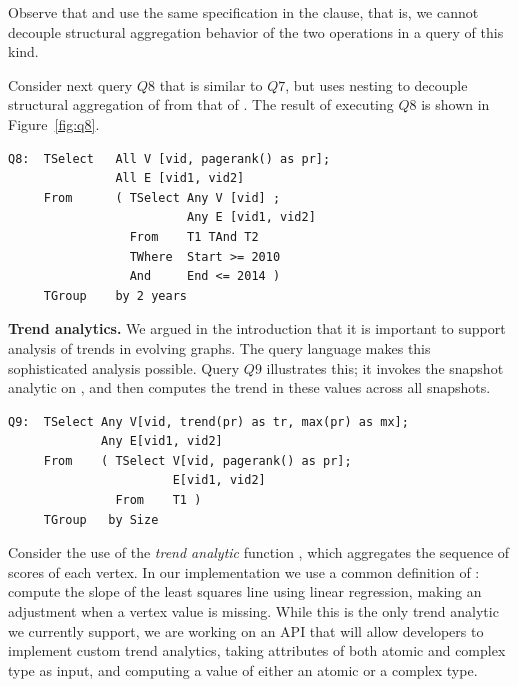 Observe that  and  use the same
specification in the  clause, that is, we cannot
decouple structural aggregation behavior of the two operations in a
query of this kind.

Consider next query $Q8$ that is similar to $Q7$, but uses nesting to
decouple structural aggregation of  from that of
. The result of executing $Q8$ is shown in
Figure~\ref{fig:q8}.

\begin{small}
\begin{verbatim}
Q8:  TSelect   All V [vid, pagerank() as pr];
               All E [vid1, vid2]
     From      ( TSelect Any V [vid] ; 
                         Any E [vid1, vid2]
                 From    T1 TAnd T2
                 TWhere  Start >= 2010 
                 And     End <= 2014 )
     TGroup    by 2 years
\end{verbatim}
\end{small}

{\bf Trend analytics.} We argued in the introduction that it is
important to support analysis of trends in evolving graphs.  The \ql
query language makes this sophisticated analysis possible.  Query $Q9$
illustrates this; it invokes the snapshot analytic 
on , and then computes the trend in these values across all
snapshots.

\begin{small}
\begin{verbatim}
Q9:  TSelect Any V[vid, trend(pr) as tr, max(pr) as mx];
             Any E[vid1, vid2]  
     From    ( TSelect V[vid, pagerank() as pr];   
                       E[vid1, vid2]
               From    T1 )
     TGroup   by Size
\end{verbatim}
\end{small}

Consider the use of the {\em trend analytic} function
, which aggregates the sequence of 
scores of each vertex.  In our implementation we use a common
definition of : compute the slope of the least squares
line using linear regression, making an adjustment when a vertex value
is missing.  While this is the only trend analytic we currently
support, we are working on an API that will allow developers to
implement custom trend analytics, taking attributes of both atomic and
complex type as input, and computing a value of either an atomic or a
complex type.

